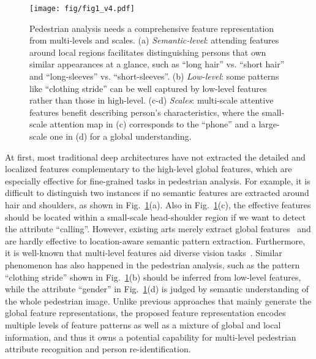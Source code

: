 \documentclass[10pt,twocolumn,letterpaper]{article}
\begin{document}
\begin{figure}[t]
\centering
\texttt{[image: fig/fig1\_v4.pdf]}
\caption{
Pedestrian analysis needs a comprehensive feature representation from multi-levels and scales.
(a) \textit{Semantic-level}: attending features around local regions facilitates distinguishing persons that own similar appearances at a glance, such as ``long hair'' vs. ``short hair'' and ``long-sleeves'' vs. ``short-sleeves''.
(b) \textit{Low-level}: some patterns like ``clothing stride'' can be well captured by low-level features rather than those in high-level.
(c-d) \textit{Scales}: multi-scale attentive features benefit describing person's characteristics, where the small-scale attention map in (c) corresponds to the ``phone'' and a large-scale one in (d) for a global understanding.
}
\label{fig:fig1}
\vspace{-5pt}
\end{figure}



At first, most traditional deep architectures have not extracted the detailed and localized features complementary to the high-level global features, which are especially effective for fine-grained tasks in pedestrian analysis.
For example, it is difficult to distinguish two instances if no semantic features are extracted around hair and shoulders, as shown in Fig.~\ref{fig:fig1}(a).
Also in Fig.~\ref{fig:fig1}(c), the effective features should be located within a small-scale head-shoulder region if we want to detect the attribute ``calling''.
However, existing arts merely extract global features~\cite{li2015multi, sudowe2015person, xiao2016learning} and are hardly effective to location-aware semantic pattern extraction.
Furthermore, it is well-known that multi-level features aid diverse vision tasks~\cite{newell2016stacked,cornia2016deep}.
Similar phenomenon has also happened in the pedestrian analysis, such as the pattern ``clothing stride'' shown in Fig.~\ref{fig:fig1}(b) should be inferred from low-level features, while the attribute ``gender'' in Fig.~\ref{fig:fig1}(d) is judged by semantic understanding of the whole pedestrian image.
Unlike previous approaches that mainly generate the global feature representations, the proposed feature representation encodes multiple levels of feature patterns as well as a mixture of global and local information, and thus it owns a potential capability for multi-level pedestrian attribute recognition and person re-identification.
\end{document}
